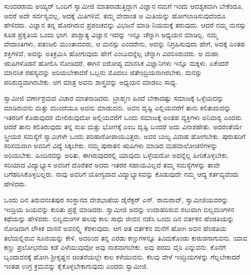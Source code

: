  ಸುಂದರರಾಮ ಅಯ್ಯರ್ ಒಂದಿಗೆ ಸ್ವಾಮೀಜಿ ಮಾತನಾಡುತ್ತಿದ್ದಾಗ ವಿಜ್ಞಾನ ನಮಗೆ ಇಂದು ಆವಶ್ಯಕವಾಗಿ ಬೇಕೆಂದೂ, ಆದರೆ ಅದೇ ಸರ್ವಸ್ವವಲ್ಲ, ಅದಕ್ಕೆ ಮಿತಿಗಳಿವೆ, ತಮ್ಮ ವೇದಾಂತ ಆ ಮಿತಿಯನ್ನು ಹೋಗಲಾಡಿಸುವುದೆಂದೂ ಹೇಳಿದರು. ವಿಜ್ಞಾನ ತನ್ನ ಹೊರಗಿರುವ ಪ್ರಪಂಚವನ್ನು ವಿಭಜನೆ ಮಾಡಿ ನಿಯಮಕ್ಕೆ ತರುವುದು. ಆದರೆ ನಮ್ಮ ಮನಸ್ಸು ಕೂಡ ಪ್ರಕೃತಿಯ ಒಂದು ಭಾಗ. ಪಾಶ್ಚಾತ್ಯ ವಿಜ್ಞಾನ ಇದನ್ನು ಇನ್ನೂ ಚೆನ್ನಾಗಿ ಅಧ್ಯಯನ ಮಾಡಿಲ್ಲ. ನಮ್ಮ ವೇದಾಂತಿಗಳು, ಪತಂಜಲಿ ಮುಂತಾದವರು, ಆ ಮನಸ್ಸು ಎಂದರೇನು, ಅದನ್ನು ನಿಗ್ರಹಿಸುವುದು ಹೇಗೆ, ಅದಕ್ಕೆ ಎಂತಹ ಶಕ್ತಿಗಳಿವೆ, ಅದನ್ನು ಅತಿಕ್ರಮಿಸಿ ಹೋಗುವುದು ಹೇಗೆ ಎಂಬುದನ್ನೆಲ್ಲ ಚೆನ್ನಾಗಿ ವಿವರಿಸಿರುವರು. ಆ ಮಹಾ ಋಷಿಗಳೊಡನೆ ಹೋಲಿಸಿ ನೋಡಿದರೆ, ಈಗಿನ ಐರೋಪ್ಯ ಮಾನಸಿಕ ವಿಜ್ಞಾನಿಗಳು ಇನ್ನೂ ಮಕ್ಕಳು. ಏಕೆಂದರೆ ಮಾನಸಿಕ ರಹಸ್ಯವನ್ನು ಅರಿಯಬೇಕಾದರೆ ಒಬ್ಬನು ಮೊದಲು ಜಿತೇಂದ್ರಿಯನಾಗಿರಬೇಕು, ಮನಸ್ಸು ಪರಿಶುದ್ಧವಾಗಿರಬೇಕು. ಆಗ ಮಾತ್ರ ಅವನು ಶಾಸ್ತ್ರವನ್ನು ಅಧ್ಯಯನ ಮಾಡಲು ಸಾಧ್ಯ. 

 ಸ್ವಾಮೀಜಿ ವರ್ಣಾಶ್ರಮದ ವಿಚಾರ ಮಾತನಾಡಿದರು. ಬ್ರಾಹ್ಮಣ ಹಿಂದೆ ಬೇಕಾದಷ್ಟು ಸಮಾಜಕ್ಕೆ ಒಳ್ಳೆಯದನ್ನು ಮಾಡಿರುವನು ಮತ್ತು ಮುಂದೆಯೂ ಅವನು ಮಾಡುವನು. ಅವನ ದೃಷ್ಟಿ ಎಲ್ಲಿಯವರೆಗೆ ತಾನು ಕಲಿತುದುದನ್ನು ಇತರರಿಗೆ ಕೊಡುವುದರ ಮೇಲಿರುವುದೋ ಅಲ್ಲಿಯವರೆಗೆ ಒಂದು ಸಮಾಜಕ್ಕೆ ಅಂತಹ ವ್ಯಕ್ತಿಗಳು ಅನಿವಾರ‍್ಯ ಎಂದರು. ಆದರೆ ತಾನು ಕಲಿತಿರುವುದು ತನ್ನ ಸುಖ ಮತ್ತು ಭೋಗಕ್ಕೆ ಎಂಬ ದೃಷ್ಟಿ ಬಂದರೆ ಅದು ವಿನಾಶಹೇತು. ಅದರಂತೆಯೇ ಸ್ತ್ರೀಯರ ಸಮಸ್ಯೆಗೆ ಸ್ವಾಮಿಗಳೇ ಒಂದು ಪರಿಹಾರೋಪಾಯವಿತ್ತರು. ಅವರ ಬಾಲ್ಯ ವಿವಾಹ ಹೋಗಬೇಕು. ಪುರುಷರಿಗೆ ಸರಿಸಮವಾಗಿ ಅವರಿಗೆ ವಿದ್ಯೆ ಸಿಕ್ಕಬೇಕು. ನಮ್ಮ ಪುರಾತನ ಋಷಿಗಳು ಮಾಡಿದ ಮಹದಾಲೋಚನೆಗಳನ್ನು ಅರಿಯಬೇಕು. ಹಿಂದಿನದನ್ನು ಅರಿತು, ಈಗಿರುವುದರಲ್ಲಿ ಯಾವುದು ಒಳ್ಳೆಯದೋ ಅದನ್ನೆಲ್ಲ ಹೀರಿಕೊಳ್ಳಬೇಕು. ಸರಿಯಾದ ವಿದ್ಯಾಭ್ಯಾಸ ಅವರಿಗೆ ದೊರೆತರೆ ಅವರು ಇತರರ ಸಹಾಯವಿಲ್ಲದೆ ತಮ್ಮ ಸಮಸ್ಯೆಗಳನ್ನು ತಾವೇ ಬಗೆಹರಿಸಿಕೊಳ್ಳಬಲ್ಲರು. ನಾವು ಅವರಿಗೆ ಯೋಗ್ಯವಾದ ವಿದ್ಯಾಭ್ಯಾಸವನ್ನು ಕೊಡುವುದೇ ನಮ್ಮ ಆದ್ಯ ಕರ್ತವ್ಯವೆಂದು ಹೇಳಿದರು. 

\newpage

 ಒಂದು ದಿನ ತಿರುವನಂತಪುರ ಸಂಸ್ಥಾನದ ದೇಶಭಾಷೆಯ ಡೈರೆಕ್ಟರ್ ಎಸ್. ರಾಮರಾವ್, ಸ್ವಾಮೀಜಿಯವರನ್ನು ಇಂದ್ರಿಯ ಜಯವನ್ನು ಕುರಿತು ಪ್ರಶ್ನೆ ಮಾಡಿದರು. ಸ್ವಾಮೀಜಿ ಅದನ್ನು ಉದಾಹರಿಸುವ ಸಲುವಾಗಿ ಬಿಲ್ವಮಂಗಳನ ಕಥೆಯನ್ನು ಹೇಳಿದರು. ಬಿಲ್ವಮಂಗಳ ಹಲವು ಕಾಲ ಸಾಧು ಜೀವನ ನಡೆಸಿ ಒಂದು ದಿನ ವರ್ತಕನ ಹೆಂಡತಿಯನ್ನು ನೋಡಿದಾಗ ಲೌಕಿಕ ವಾಸನೆ ಅವನಲ್ಲ್ಲಿ ಕೆರಳುವುದು. ಆಗ ಆತ ವರ್ತಕನ ಮನೆಗೆ ಹೋಗಿ ಅವನ ಹೆಂಡತಿಯ ತಲೆಯಲ್ಲಿರುವ ಸೂಜಿಯನ್ನು ಕೇಳಿ, ಅದರಿಂದ ತನ್ನ ಎರಡು ಕಣ್ಣುಗಳನ್ನೂ ತಿವಿದುಕೊಂಡು ಕುರುಡನಾಗುವನು. ಯಾವ ಕಣ್ಣು ಪ್ರಲೋಭನೆಯ ಕಡೆ ಎಳೆಯುವುವೋ ಅವು ನಾಶವಾಗಬೇಕು. ಅವು ಪರಮ ವೈರಿ ಎನ್ನುವನು. ಕೊನೆಗೆ ಬೃಂದಾವನಕ್ಕೆ ಹೋಗಿ ಶ‍್ರೀಕೃಷ್ಣನ ಚಿಂತನೆಯಲ್ಲೇ ಕಾಲ ಕಳೆಯುವನು. ಕೆಲವು ವೇಳೆ ಇಂದ್ರಿಯಗಳನ್ನು ಗೆಲ್ಲಬೇಕಾದರೆ ಇಂತಹ ಉಗ್ರ ಕ್ರಮವನ್ನು ಕೈಕೊಳ್ಳಬೇಕಾಗುವುದು ಎಂದರು ಸ್ವಾಮೀಜಿ. 


